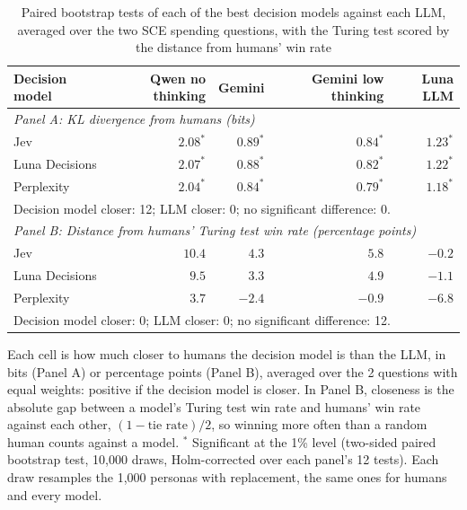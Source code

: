 \begin{table}[htbp]
\centering
\caption{Paired bootstrap tests of each of the best decision models against each LLM, averaged over the two SCE spending questions, with the Turing test scored by the distance from humans' win rate}
\label{tab:sce_bootstrap_2_best}
\begin{tabular}{lrrrr}
\toprule
Decision model & Qwen no thinking & Gemini & Gemini low thinking & Luna LLM \\
\midrule
\multicolumn{5}{l}{\textit{Panel A: KL divergence from humans (bits)}} \\
\midrule
Jev & $2.08^{*}$ & $0.89^{*}$ & $0.84^{*}$ & $1.23^{*}$ \\
Luna Decisions & $2.07^{*}$ & $0.88^{*}$ & $0.82^{*}$ & $1.22^{*}$ \\
Perplexity & $2.04^{*}$ & $0.84^{*}$ & $0.79^{*}$ & $1.18^{*}$ \\
\multicolumn{5}{l}{\footnotesize Decision model closer: 12; LLM closer: 0; no significant difference: 0.} \\
\midrule
\multicolumn{5}{l}{\textit{Panel B: Distance from humans' Turing test win rate (percentage points)}} \\
\midrule
Jev & $10.4$ & $4.3$ & $5.8$ & $-0.2$ \\
Luna Decisions & $9.5$ & $3.3$ & $4.9$ & $-1.1$ \\
Perplexity & $3.7$ & $-2.4$ & $-0.9$ & $-6.8$ \\
\multicolumn{5}{l}{\footnotesize Decision model closer: 0; LLM closer: 0; no significant difference: 12.} \\
\bottomrule
\end{tabular}
\par\smallskip
\parbox{\linewidth}{\footnotesize Each cell is how much closer to humans the decision model is than the LLM, in bits (Panel A) or percentage points (Panel B), averaged over the 2 questions with equal weights: positive if the decision model is closer. In Panel B, closeness is the absolute gap between a model's Turing test win rate and humans' win rate against each other, $(1 - \text{tie rate})/2$, so winning more often than a random human counts against a model. $^{*}$ Significant at the 1\% level (two-sided paired bootstrap test, 10,000 draws, Holm-corrected over each panel's 12 tests). Each draw resamples the 1,000 personas with replacement, the same ones for humans and every model.}
\end{table}
